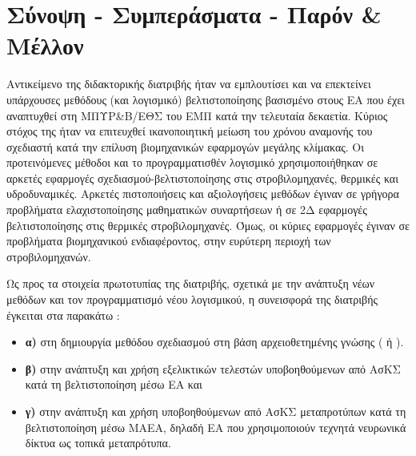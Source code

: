 
\chapter{Σύνοψη - Συμπεράσματα - Παρόν \& Μέλλον} %



\ifpdf
    \graphicspath{{7/figures/PNG/}{7/figures/PDF/}{7/figures/}}
\else
    \graphicspath{{7/figures/EPS/}{7/figures/}}
\fi

Αντικείμενο της διδακτορικής διατριβής ήταν να εμπλουτίσει και να επεκτείνει υπάρχουσες μεθόδους (και λογισμικό) βελτιστοποίησης βασισμένο στους ΕΑ που έχει αναπτυχθεί στη ΜΠΥΡ\&Β/ΕΘΣ του ΕΜΠ κατά την τελευταία δεκαετία. Κύριος στόχος της ήταν να επιτευχθεί ικανοποιητική μείωση του χρόνου αναμονής του σχεδιαστή κατά την επίλυση βιομηχανικών εφαρμογών μεγάλης κλίμακας. Οι προτεινόμενες μέθοδοι και το προγραμματισθέν λογισμικό χρησιμοποιήθηκαν σε αρκετές εφαρμογές σχεδιασμού-βελτιστοποίησης στις στροβιλομηχανές, θερμικές και υδροδυναμικές. Αρκετές πιστοποιήσεις και αξιολογήσεις μεθόδων έγιναν σε γρήγορα προβλήματα ελαχιστοποίησης μαθηματικών συναρτήσεων ή σε 2Δ εφαρμογές βελτιστοποίησης στις θερμικές στροβιλομηχανές. Όμως, οι κύριες εφαρμογές έγιναν σε προβλήματα βιομηχανικού ενδιαφέροντος, στην ευρύτερη περιοχή των στροβιλομηχανών. 

Ως προς τα στοιχεία πρωτοτυπίας της διατριβής, σχετικά με την ανάπτυξη νέων μεθόδων και τον προγραμματισμό νέου λογισμικού, η συνεισφορά της διατριβής έγκειται στα παρακάτω :
\begin{itemize}
\item[]{\bf α)} στη δημιουργία μεθόδου σχεδιασμού στη βάση αρχειοθετημένης γνώσης ( ή ).
\item[]{\bf β)} στην ανάπτυξη και χρήση εξελικτικών τελεστών υποβοηθούμενων από \newline ΑσΚΣ κατά τη βελτιστοποίηση μέσω ΕΑ και
\item[]{\bf γ)} στην ανάπτυξη και χρήση υποβοηθούμενων από ΑσΚΣ μεταπροτύπων κατά τη βελτιστοποίηση μέσω ΜΑΕΑ, δηλαδή ΕΑ που χρησιμοποιούν τεχνητά νευρωνικά δίκτυα ως τοπικά μεταπρότυπα.
\end{itemize}

